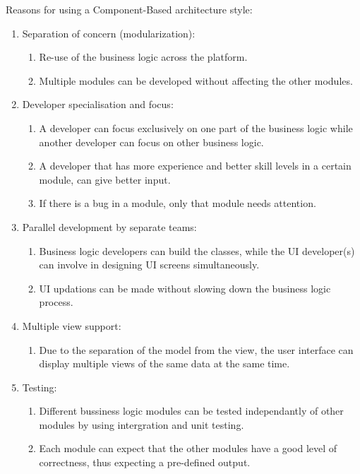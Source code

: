 Reasons for using a Component-Based architecture style:
	\begin{enumerate}
		\item Separation of concern (modularization):
		\begin{enumerate}
			\item Re-use of the business logic across the platform.
			\item Multiple modules can be developed without affecting the other modules.
		\end{enumerate}
		
		\item Developer specialisation and focus:
		\begin{enumerate}
			\item A developer can focus exclusively on one part of the business logic while another developer can focus on other business logic.
			\item A developer that has more experience and better skill levels in a certain module, can give better input.
			\item If there is a bug in a module, only that module needs attention.
		\end{enumerate}
		
		\item Parallel development by separate teams:
		\begin{enumerate}
			\item Business logic developers can build the classes, while the UI developer(s) can involve in designing UI screens simultaneously.
			\item UI updations can be made without slowing down the business logic process.
		\end{enumerate}
		
		\item Multiple view support:
		\begin{enumerate}
			\item Due to the separation of the model from the view, the user interface can display multiple views of the same data at the same time.
		\end{enumerate}
		
		\item Testing:
		\begin{enumerate}
			\item Different bussiness logic modules can be tested independantly of other modules by using intergration and unit testing.
			\item Each module can expect that the other modules have a good level of correctness, thus expecting a pre-defined output.
		\end{enumerate}
	\end{enumerate}
